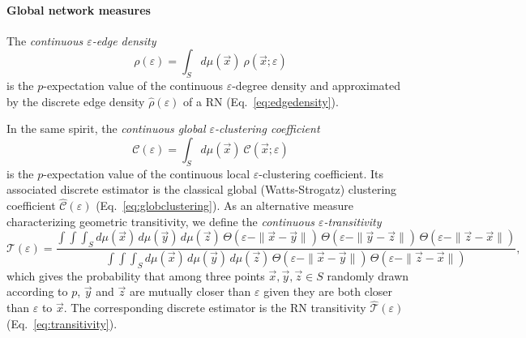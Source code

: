 		\paragraph{Global network measures}
		The \emph{continuous $\varepsilon$-edge density}
\begin{equation}
\rho(\varepsilon)=\int_S d\mu(\vec{x})\ \rho(\vec{x};\varepsilon)
\end{equation}
\noindent
is the $p$-expectation value of the continuous $\varepsilon$-degree density and approximated by the discrete edge density $\hat{\rho}(\varepsilon)$ of a RN (Eq.~\eqref{eq:edgedensity}).

		In the same spirit, the \emph{continuous global $\varepsilon$-clustering coefficient}
\begin{equation}
\mathcal{C}(\varepsilon)=\int_S d\mu(\vec{x})\ \mathcal{C}(\vec{x};\varepsilon)
\end{equation}
\noindent
is the $p$-expectation value of the continuous local $\varepsilon$-clustering coefficient. Its associated discrete estimator is the classical global (Watts-Strogatz) clustering coefficient $\hat{\mathcal{C}}(\varepsilon)$ (Eq.~\ref{eq:globclustering}). As an alternative measure characterizing geometric transitivity, we define the \emph{continuous $\varepsilon$-transitivity}
\begin{equation}
\mathcal{T}(\varepsilon)=\frac{\int\int\int_S d\mu(\vec{x})\, d\mu(\vec{y})\, d\mu(\vec{z})\, \Theta(\varepsilon-\|\vec{x}-\vec{y}\|)\, \Theta(\varepsilon-\|\vec{y}-\vec{z}\|)\, \Theta(\varepsilon-\|\vec{z}-\vec{x}\|)}{\int\int\int_S d\mu(\vec{x})\, d\mu(\vec{y})\, d\mu(\vec{z})\, \Theta(\varepsilon-\|\vec{x}-\vec{y}\|)\, \Theta(\varepsilon-\|\vec{z}-\vec{x}\|)},
\end{equation}
\noindent
which gives the probability that among three points $\vec{x},\vec{y},\vec{z}\in S$ randomly drawn according to $p$, $\vec{y}$ and $\vec{z}$ are mutually closer than $\varepsilon$ given they are both closer than $\varepsilon$ to $\vec{x}$. The corresponding discrete estimator is the RN transitivity $\hat{\mathcal{T}}(\varepsilon)$ (Eq.~\ref{eq:transitivity}).

